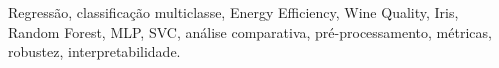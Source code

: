 Regressão, classificação multiclasse, Energy Efficiency, Wine Quality, Iris, Random Forest, MLP, SVC, análise comparativa, pré-processamento, métricas, robustez, interpretabilidade.
